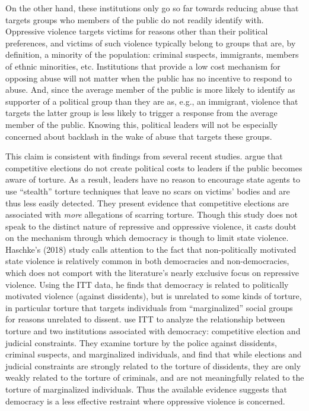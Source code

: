 \documentclass[11pt]{article}
\begin{document}
On the other hand, these institutions only go so far towards reducing abuse that targets groups who members of the public do not readily identify with. Oppressive violence targets victims for reasons other than their political preferences, and victims of such violence typically belong to groups that are, by definition, a minority of the population: criminal suspects, immigrants, members of ethnic minorities, etc. Institutions that provide a low cost mechanism for opposing abuse will not matter when the public has no incentive to respond to abuse. And, since the average member of the public is more likely to identify as supporter of a political group than they are as, e.g., an immigrant, violence that targets the latter group is less likely to trigger a response from the average member of the public. Knowing this, political leaders will not be especially concerned about backlash in the wake of abuse that targets these groups. 

This claim is consistent with findings from several recent studies. \citet{ConradHillMoore2018} argue that competitive elections do not create political costs to leaders if the public becomes aware of torture. As a result, leaders have no reason to encourage state agents to use ``stealth'' torture techniques that leave no scars on victims' bodies and are thus less easily detected. They present evidence that competitive elections are associated with {\em more} allegations of scarring torture. Though this study does not speak to the distinct nature of repressive and oppressive violence, it casts doubt on the mechanism through which democracy is though to limit state violence. Haschke's (2018) study calls attention to the fact that non-politically motivated state violence is relatively common in both democracies and non-democracies, which does not comport with the literature's nearly exclusive focus on repressive violence. Using the ITT data, he finds that democracy is related to politically motivated violence (against dissidents), but is unrelated to some kinds of torture, in particular torture that targets individuals from ``marginalized'' social groups for reasons unrelated to dissent. \citet{JacksonHillHall2018} use ITT to analyze the relationship between torture and two  institutions associated with democracy: competitive election and judicial constraints. They examine torture by the police against dissidents, criminal suspects, and marginalized individuals, and find that while elections and judicial constraints are strongly related to the torture of dissidents, they are only weakly related to the torture of criminals, and are not meaningfully related to the torture of marginalized individuals. Thus the available evidence suggests that democracy is a less effective restraint where oppressive violence is concerned.       
\end{document}
